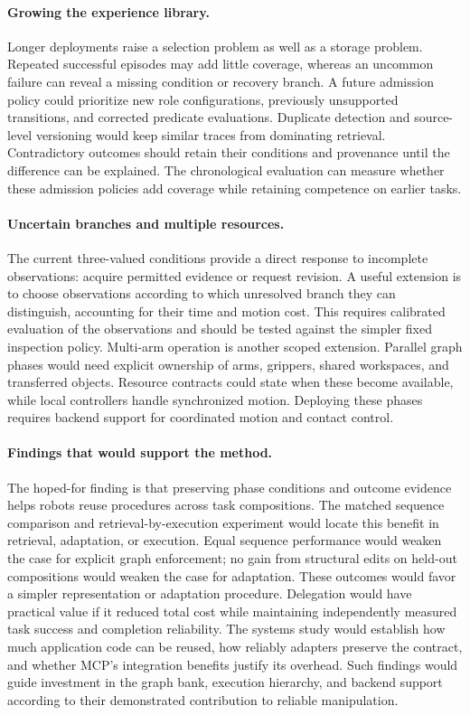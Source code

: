 \paragraph{Growing the experience library.}
Longer deployments raise a selection problem as well as a storage problem. Repeated successful episodes may add little coverage, whereas an uncommon failure can reveal a missing condition or recovery branch. A future admission policy could prioritize new role configurations, previously unsupported transitions, and corrected predicate evaluations. Duplicate detection and source-level versioning would keep similar traces from dominating retrieval. Contradictory outcomes should retain their conditions and provenance until the difference can be explained. The chronological evaluation can measure whether these admission policies add coverage while retaining competence on earlier tasks.

\paragraph{Uncertain branches and multiple resources.}
The current three-valued conditions provide a direct response to incomplete observations: acquire permitted evidence or request revision. A useful extension is to choose observations according to which unresolved branch they can distinguish, accounting for their time and motion cost. This requires calibrated evaluation of the observations and should be tested against the simpler fixed inspection policy. Multi-arm operation is another scoped extension. Parallel graph phases would need explicit ownership of arms, grippers, shared workspaces, and transferred objects. Resource contracts could state when these become available, while local controllers handle synchronized motion. Deploying these phases requires backend support for coordinated motion and contact control.

\paragraph{Findings that would support the method.}
The hoped-for finding is that preserving phase conditions and outcome evidence helps robots reuse procedures across task compositions. The matched sequence comparison and retrieval-by-execution experiment would locate this benefit in retrieval, adaptation, or execution. Equal sequence performance would weaken the case for explicit graph enforcement; no gain from structural edits on held-out compositions would weaken the case for adaptation. These outcomes would favor a simpler representation or adaptation procedure. Delegation would have practical value if it reduced total cost while maintaining independently measured task success and completion reliability. The systems study would establish how much application code can be reused, how reliably adapters preserve the contract, and whether MCP's integration benefits justify its overhead. Such findings would guide investment in the graph bank, execution hierarchy, and backend support according to their demonstrated contribution to reliable manipulation.

